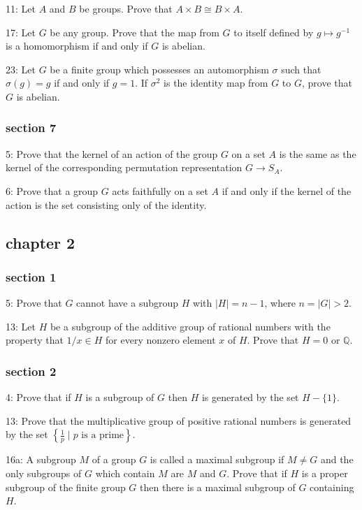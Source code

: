 \documentclass{article}
\begin{document}
11: Let $A$ and $B$ be groups. Prove that $A \times B \cong B \times A$.

17: Let $G$ be any group. Prove that the map from $G$ to itself defined by $g \mapsto g^{-1}$ is a homomorphism if and only if $G$ is abelian.

23: Let $G$ be a finite group which possesses an automorphism $\sigma$ such that $\sigma(g)=g$ if and only if $g=1$. If $\sigma^{2}$ is the identity map from $G$ to $G$, prove that $G$ is abelian. 

\subsubsection*{section 7}
5: Prove that the kernel of an action of the group $G$ on a set $A$ is the same as the kernel of the corresponding permutation representation $G\to S_A$. 

6: Prove that a group $G$ acts faithfully on a set $A$ if and only if the kernel of the action is the set consisting only of the identity. 

\subsection*{chapter 2}
\subsubsection*{section 1}
5: Prove that $G$ cannot have a subgroup $H$ with $|H|=n-1$, where $n=|G|>2$.

13: Let $H$ be a subgroup of the additive group of rational numbers with the property that $1 / x \in H$ for every nonzero element $x$ of $H$. Prove that $H=0$ or $\mathbb{Q}$.

\subsubsection*{section 2}
4: Prove that if $H$ is a subgroup of $G$ then $H$ is generated by the set $H-\{1\}$.

13: Prove that the multiplicative group of positive rational numbers is generated by the set $\left\{\frac{1}{p} \mid \text{$p$ is a prime} \right\}$. 

16a: A subgroup $M$ of a group $G$ is called a maximal subgroup if $M \neq G$ and the only subgroups of $G$ which contain $M$ are $M$ and $G$. Prove that if $H$ is a proper subgroup of the finite group $G$ then there is a maximal subgroup of $G$ containing $H$.
\end{document}
